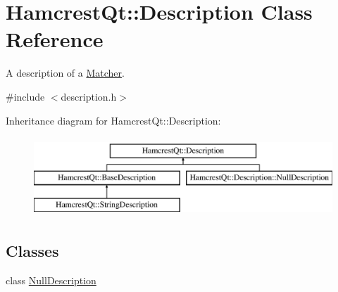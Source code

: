 \hypertarget{class_hamcrest_qt_1_1_description}{\section{Hamcrest\-Qt\-:\-:Description Class Reference}
\label{class_hamcrest_qt_1_1_description}
}


A description of a \hyperlink{class_hamcrest_qt_1_1_matcher}{Matcher}.  




{\ttfamily \#include $<$description.\-h$>$}

Inheritance diagram for Hamcrest\-Qt\-:\-:Description\-:\begin{figure}[H]
\begin{center}
\leavevmode
\includegraphics[height=3.000000cm]{class_hamcrest_qt_1_1_description}
\end{center}
\end{figure}
\subsection*{Classes}
\begin{DoxyCompactItemize}
\item 
class \hyperlink{class_hamcrest_qt_1_1_description_1_1_null_description}{Null\-Description}
\end{DoxyCompactItemize}
